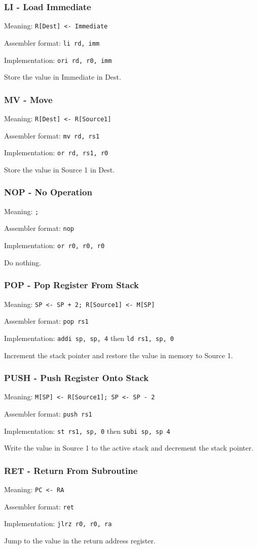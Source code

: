 \documentclass{article}
\begin{document}
\subsubsection{LI - Load Immediate}
Meaning: \verb|R[Dest] <- Immediate|

Assembler format: \verb|li rd, imm|

Implementation: \verb|ori rd, r0, imm|

Store the value in Immediate in Dest.

\subsubsection{MV - Move}
Meaning: \verb|R[Dest] <- R[Source1]|

Assembler format: \verb|mv rd, rs1|

Implementation: \verb|or rd, rs1, r0|

Store the value in Source 1 in Dest.

\subsubsection{NOP - No Operation}
Meaning: \verb|;|

Assembler format: \verb|nop|

Implementation: \verb|or r0, r0, r0|

Do nothing.

\subsubsection{POP - Pop Register From Stack}
Meaning: \verb|SP <- SP + 2; R[Source1] <- M[SP]|

Assembler format: \verb|pop rs1|

Implementation: \verb|addi sp, sp, 4| then \verb|ld rs1, sp, 0|

Increment the stack pointer and restore the value in memory to Source 1.

\subsubsection{PUSH - Push Register Onto Stack}
Meaning: \verb|M[SP] <- R[Source1]; SP <- SP - 2|

Assembler format: \verb|push rs1|

Implementation: \verb|st rs1, sp, 0| then \verb|subi sp, sp 4|

Write the value in Source 1 to the active stack and decrement the stack pointer.

\subsubsection{RET - Return From Subroutine}
Meaning: \verb|PC <- RA|

Assembler format: \verb|ret|

Implementation: \verb|jlrz r0, r0, ra|

Jump to the value in the return address register.
\end{document}
